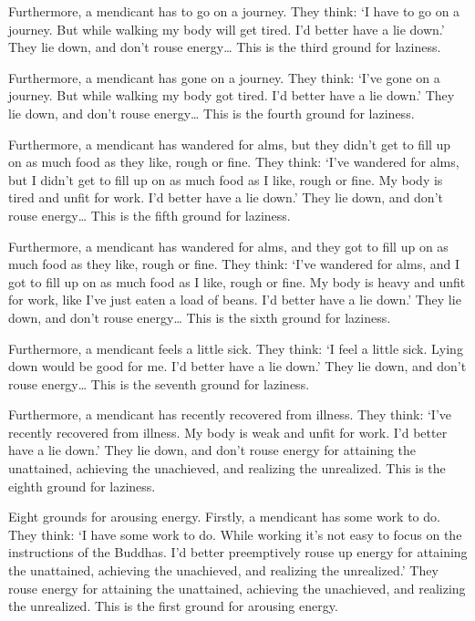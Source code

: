 \documentclass[12pt,openany]{book}%
\begin{document}
Furthermore, a mendicant has to go on a journey. They think: ‘I have to go on a journey. But while walking my body will get tired. I’d better have a lie down.’ They lie down, and don’t rouse energy… This is the third ground for laziness. 

Furthermore, a mendicant has gone on a journey. They think: ‘I’ve gone on a journey. But while walking my body got tired. I’d better have a lie down.’ They lie down, and don’t rouse energy… This is the fourth ground for laziness. 

Furthermore, a mendicant has wandered for alms, but they didn’t get to fill up on as much food as they like, rough or fine. They think: ‘I’ve wandered for alms, but I didn’t get to fill up on as much food as I like, rough or fine. My body is tired and unfit for work. I’d better have a lie down.’ They lie down, and don’t rouse energy… This is the fifth ground for laziness. 

Furthermore, a mendicant has wandered for alms, and they got to fill up on as much food as they like, rough or fine. They think: ‘I’ve wandered for alms, and I got to fill up on as much food as I like, rough or fine. My body is heavy and unfit for work, like I’ve just eaten a load of beans. I’d better have a lie down.’ They lie down, and don’t rouse energy… This is the sixth ground for laziness. 

Furthermore, a mendicant feels a little sick. They think: ‘I feel a little sick. Lying down would be good for me. I’d better have a lie down.’ They lie down, and don’t rouse energy… This is the seventh ground for laziness. 

Furthermore, a mendicant has recently recovered from illness. They think: ‘I’ve recently recovered from illness. My body is weak and unfit for work. I’d better have a lie down.’ They lie down, and don’t rouse energy for attaining the unattained, achieving the unachieved, and realizing the unrealized. This is the eighth ground for laziness. 

Eight grounds for arousing energy. Firstly, a mendicant has some work to do. They think: ‘I have some work to do. While working it’s not easy to focus on the instructions of the Buddhas. I’d better preemptively rouse up energy for attaining the unattained, achieving the unachieved, and realizing the unrealized.’ They rouse energy for attaining the unattained, achieving the unachieved, and realizing the unrealized. This is the first ground for arousing energy. 
\end{document}

